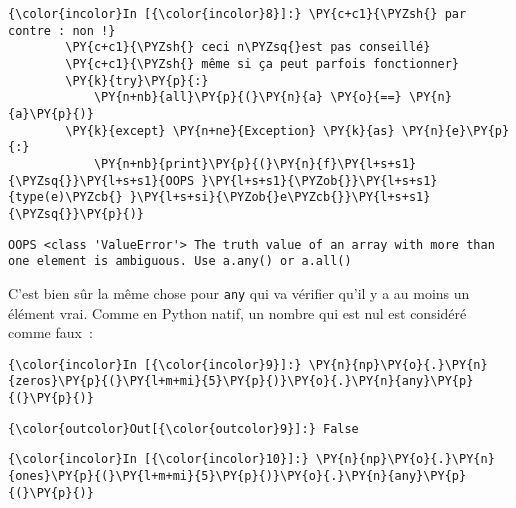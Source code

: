     \begin{Verbatim}[commandchars=\\\{\},frame=single,framerule=0.3mm,rulecolor=\color{cellframecolor}]
{\color{incolor}In [{\color{incolor}8}]:} \PY{c+c1}{\PYZsh{} par contre : non !}
        \PY{c+c1}{\PYZsh{} ceci n\PYZsq{}est pas conseillé}
        \PY{c+c1}{\PYZsh{} même si ça peut parfois fonctionner}
        \PY{k}{try}\PY{p}{:}
            \PY{n+nb}{all}\PY{p}{(}\PY{n}{a} \PY{o}{==} \PY{n}{a}\PY{p}{)}
        \PY{k}{except} \PY{n+ne}{Exception} \PY{k}{as} \PY{n}{e}\PY{p}{:}
            \PY{n+nb}{print}\PY{p}{(}\PY{n}{f}\PY{l+s+s1}{\PYZsq{}}\PY{l+s+s1}{OOPS }\PY{l+s+s1}{\PYZob{}}\PY{l+s+s1}{type(e)\PYZcb{} }\PY{l+s+si}{\PYZob{}e\PYZcb{}}\PY{l+s+s1}{\PYZsq{}}\PY{p}{)}
\end{Verbatim}


    \begin{Verbatim}[commandchars=\\\{\},frame=single,framerule=0.3mm,rulecolor=\color{cellframecolor}]
OOPS <class 'ValueError'> The truth value of an array with more than one element is ambiguous. Use a.any() or a.all()
\end{Verbatim}

    C'est bien sûr la même chose pour \texttt{any} qui va vérifier qu'il y a
au moins un élément vrai. Comme en Python natif, un nombre qui est nul
est considéré comme faux~:

    \begin{Verbatim}[commandchars=\\\{\},frame=single,framerule=0.3mm,rulecolor=\color{cellframecolor}]
{\color{incolor}In [{\color{incolor}9}]:} \PY{n}{np}\PY{o}{.}\PY{n}{zeros}\PY{p}{(}\PY{l+m+mi}{5}\PY{p}{)}\PY{o}{.}\PY{n}{any}\PY{p}{(}\PY{p}{)}
\end{Verbatim}


\begin{Verbatim}[commandchars=\\\{\},frame=single,framerule=0.3mm,rulecolor=\color{cellframecolor}]
{\color{outcolor}Out[{\color{outcolor}9}]:} False
\end{Verbatim}
            
    \begin{Verbatim}[commandchars=\\\{\},frame=single,framerule=0.3mm,rulecolor=\color{cellframecolor}]
{\color{incolor}In [{\color{incolor}10}]:} \PY{n}{np}\PY{o}{.}\PY{n}{ones}\PY{p}{(}\PY{l+m+mi}{5}\PY{p}{)}\PY{o}{.}\PY{n}{any}\PY{p}{(}\PY{p}{)}
\end{Verbatim}


